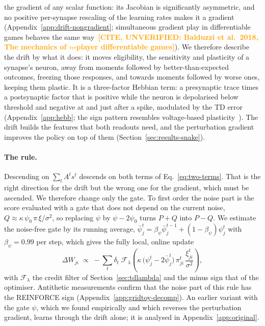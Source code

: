 \documentclass[10pt,twocolumn]{article}
\newcommand{\unverified}[1]{\textcolor{orange}{\bfseries[CITE, UNVERIFIED: #1]}}
\begin{document}
the gradient of any scalar function: its Jacobian is significantly asymmetric, and
no positive per-synapse rescaling of the learning rates makes it a gradient
(Appendix~\ref{app:drift-nongradient}; simultaneous gradient play in differentiable
games behaves the same way~\unverified{Balduzzi et al.\ 2018, The mechanics of
$n$-player differentiable games}). We therefore describe the drift by what it does:
it moves eligibility, the sensitivity and plasticity of a synapse's neuron, away from
moments followed by better-than-expected outcomes, freezing those responses, and
towards moments followed by worse ones, keeping them plastic. It is a three-factor Hebbian
term: a presynaptic trace times a postsynaptic factor that is positive while the
neuron is depolarised below threshold and negative at and just after a spike,
modulated by the TD error (Appendix~\ref{app:hebb}; the sign pattern resembles
voltage-based plasticity~\citep{Clopath2010Voltage}). The drift builds the
features that both readouts need, and the perturbation gradient improves the
policy on top of them (Section~\ref{sec:results-snake}).

\paragraph{The rule.}
Descending on $\sum_tA^ts^t$ descends on both terms of
Eq.~\eqref{eq:two-terms}. That is the right direction for the drift but the wrong
one for the gradient, which must be ascended. We therefore change only the gate.
To first order the noise part is the score evaluated with a gate that does not
depend on the current noise, $Q\approx\kappa\,\psi_0\,\pi\,\xi/\sigma^2$, so
replacing $\psi$ by $\psi-2\psi_0$ turns $P+Q$ into $P-Q$. We estimate the
noise-free gate by its running average,
$\bar\psi^t_j=\beta_\psi\bar\psi^{t-1}_j+(1-\beta_\psi)\psi^t_j$ with
$\beta_\psi=0.99$ per step, which gives the fully local, online update
\begin{equation}
\Delta W_{ji}\;\propto\;-\sum_t \delta_t\;\mathcal{F}_{\lambda}\!\left(
\kappa\,\big(\psi^t_j-2\bar\psi^t_j\big)\,\pi^t_{ji}\,
\frac{\xi^t_{ji}}{\sigma^2}\right),
\label{eq:distributed-update}
\end{equation}
with $\mathcal{F}_\lambda$ the credit filter of Section~\ref{sec:tdlambda} and the
minus sign that of the optimiser. Antithetic measurements confirm that the noise
part of this rule has the REINFORCE sign (Appendix~\ref{app:gridtoy-decomp}). An
earlier variant with the gate $\psi$, which we found empirically and which
reverses the perturbation gradient, learns through the drift alone; it is
analysed in Appendix~\ref{app:original}.
\end{document}
